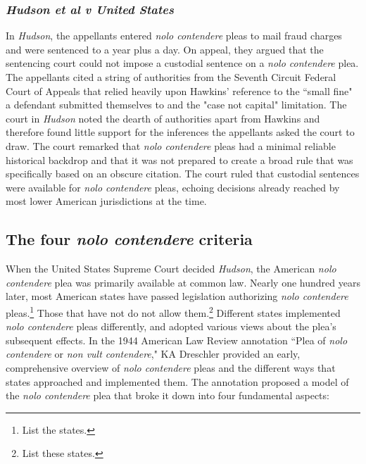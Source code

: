 \subsubsection{\textit{Hudson et al v United States}}

In \textit{Hudson}, the appellants entered \textit{nolo contendere} pleas to mail fraud charges and were sentenced to a year plus a day. On appeal, they argued that the sentencing court could not impose a custodial sentence on a \textit{nolo contendere} plea. The appellants cited a string of authorities from the Seventh Circuit Federal Court of Appeals that relied heavily upon Hawkins' reference to the ``small fine" a defendant submitted themselves to and the "case not capital" limitation. The court in \textit{Hudson} noted the dearth of authorities apart from Hawkins and therefore found little support for the inferences the appellants asked the court to draw. The court remarked that \textit{nolo contendere} pleas had a minimal reliable historical backdrop and that it was not prepared to create a broad rule that was specifically based on an obscure citation. The court ruled that custodial sentences were available for \textit{nolo contendere} pleas, echoing decisions already reached by most lower American jurisdictions at the time.

\subsection{The four \textit{nolo contendere} criteria}

When the United States Supreme Court decided \textit{Hudson}, the American \textit{nolo contendere} plea was primarily available at common law. Nearly one hundred years later, most American states have passed legislation authorizing \textit{nolo contendere} pleas.\footnote{List the states.} Those that have not do not allow them.\footnote{List these states.} Different states implemented \textit{nolo contendere} pleas differently, and adopted various views about the plea's subsequent effects. In the 1944 American Law Review annotation ``Plea of \textit{nolo contendere} or \textit{non vult contendere}," KA Dreschler provided an early, comprehensive overview of \textit{nolo contendere} pleas and the different ways that states approached and implemented them. The annotation proposed a model of the \textit{nolo contendere} plea that broke it down into four fundamental aspects:

